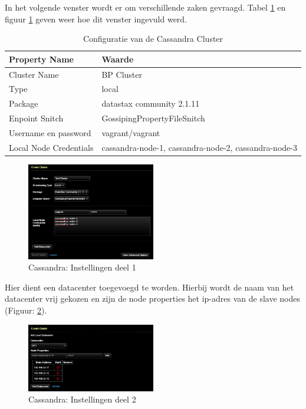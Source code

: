 In het volgende venster wordt er om verschillende zaken gevraagd.
Tabel \ref{tab:cas_conf} en figuur \ref{fig:cas_conf_1} geven weer hoe dit venster ingevuld werd.

\begin{table}[H]
  \begin{tabular}{|l|l|}
  \hline
  Property Name & Waarde \\
  \hline
  \hline
  Cluster Name & BP Cluster \\
  \hline
  Type & local \\
  \hline
  Package & datastax community 2.1.11 \\
  \hline
  Enpoint Snitch & GossipingPropertyFileSnitch \\
  \hline
  Username en password & vagrant/vagrant\\
  \hline
  Local Node Credentials & cassandra-node-1, cassandra-node-2, cassandra-node-3 \\
  \hline
  \end{tabular}
  \caption{Configuratie van de Cassandra Cluster}
  \label{tab:cas_conf}
\end{table}

\begin{figure}[H]
  	\centering
    \includegraphics[width=0.5\textwidth]{img/4_1_installatie_cassandra/1_Configuration_part_1}
    \caption{Cassandra: Instellingen deel 1}
    \label{fig:cas_conf_1}
\end{figure}

Hier dient een datacenter toegevoegd te worden.
Hierbij wordt de naam van het datacenter vrij gekozen en zijn de node properties het ip-adres van de slave nodes (Figuur: \ref{fig:cas_conf_2}).

\begin{figure}[H]
  	\centering
    \includegraphics[width=0.5\textwidth]{img/4_1_installatie_cassandra/1_Configuration_part_2}
    \caption{Cassandra: Instellingen deel 2}
    \label{fig:cas_conf_2}
\end{figure}

